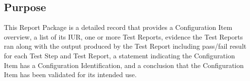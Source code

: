 \subsection{Purpose}
This Report Package is a detailed record that provides a Configuration Item
overview, a list of its IUR, one or more Test Reports, evidence the Test
Reports ran along with the output produced by the Test Report including
pass/fail result for each Test Step and Test Report, a statement indicating
the Configuration Item has a Configuration Identification, and a conclusion that
the Configuration Item has been validated for its intended use.
